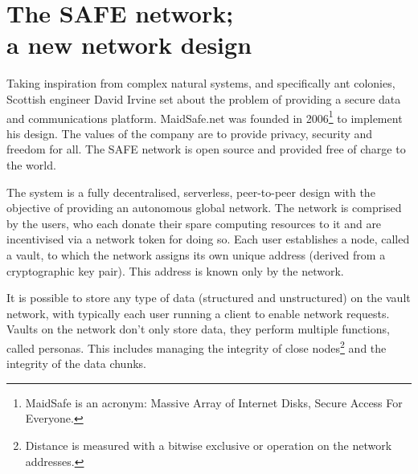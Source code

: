 \documentclass[twocolumn,english]{article}
\begin{document}
\section{The SAFE network; \\ a new network design}

Taking inspiration from complex natural systems, and specifically
ant colonies, Scottish engineer David Irvine set about the problem
of providing a secure data and communications platform. MaidSafe.net was founded in 2006\footnote{MaidSafe is an acronym: Massive Array of Internet Disks, Secure Access For Everyone.} to implement his design. The values of the company are to provide privacy, security and freedom for all.  The SAFE network is open source and provided free of charge to the world. %

The system is a fully decentralised, serverless, peer-to-peer design with
the objective of providing an autonomous global network. The network
is comprised by the users, who each donate their spare computing resources
to it and are incentivised via a network token for doing so. Each
user establishes a node, called a vault, to which the network assigns its
own unique address (derived from a cryptographic key pair). This address
is known only by the network.\cite{paulMS}

It is possible to store any type of data (structured and unstructured)
on the vault network, with typically each user running a client to enable
network requests. Vaults on the network don't
only store data, they perform multiple functions, called personas.
This includes managing the integrity of close nodes\footnote{Distance is measured with a bitwise exclusive or operation on the network addresses.} and the integrity of the data chunks.
\end{document}

